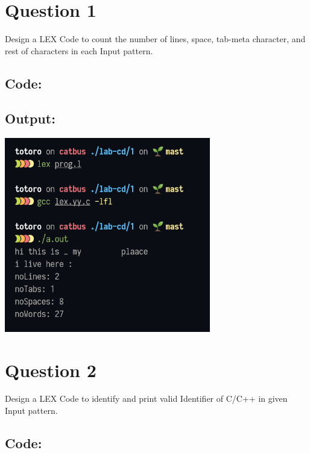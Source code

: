 \documentclass{article}
\begin{document}
\newpage
\section*{Question 1}
Design a LEX Code to count the number of lines, space,
tab-meta character, and rest of characters in each Input
pattern.
\subsection*{Code:}

\subsection*{Output:}
% 
\begin{center}
  \includegraphics[width=9cm]{1/out.png}
\end{center}

\newpage
\section*{Question 2}
Design a LEX Code to identify and print valid Identifier of
C/C++ in given Input pattern.
\subsection*{Code:}

\end{document}

